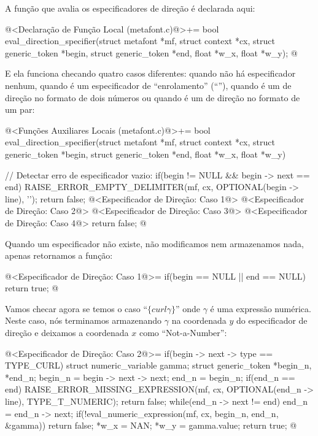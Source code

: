 {{{{{A função que avalia os especificadores de direção é declarada aqui:

\iniciocodigo
@<Declaração de Função Local (metafont.c)@>+=
bool eval_direction_specifier(struct metafont *mf, struct context *cx,
                              struct generic_token *begin,
                              struct generic_token *end, float *w_x,
                              float *w_y);
@
\fimcodigo

E ela funciona checando quatro casos diferentes: quando não há
especificador nenhum, quando é um especificador de ``enrolamento''
(``''), quando é um de direção no formato de dois
números ou quando é um de direção no formato de um par:

\iniciocodigo
@<Funções Auxiliares Locais (metafont.c)@>+=
bool eval_direction_specifier(struct metafont *mf, struct context *cx,
                              struct generic_token *begin,
                              struct generic_token *end, float *w_x,
                              float *w_y){
  // Detectar erro de especificador vazio:
  if(begin != NULL && begin -> next == end){
    RAISE_ERROR_EMPTY_DELIMITER(mf, cx, OPTIONAL(begin -> line), '{');
    return false;
  }
  @<Especificador de Direção: Caso 1@>
  @<Especificador de Direção: Caso 2@>
  @<Especificador de Direção: Caso 3@>
  @<Especificador de Direção: Caso 4@>
  return false;
}
@
\fimcodigo

Quando um especificador não existe, não modificamos nem armazenamos
nada, apenas retornamos a função:

\iniciocodigo
@<Especificador de Direção: Caso 1@>=
if(begin == NULL || end == NULL)
  return true;
@
\fimcodigo

Vamos checar agora se temos o caso ``$\{curl \gamma\}$'' onde $\gamma$ é
uma expressão numérica. Neste caso, nós terminamos armazenando
$\gamma$ na coordenada $y$ do especificador de direção e deixamos a
coordenada $x$ como ``Not-a-Number'':

\iniciocodigo
@<Especificador de Direção: Caso 2@>=
if(begin -> next -> type == TYPE_CURL){
  struct numeric_variable gamma;
  struct generic_token *begin_n, *end_n;
  begin_n = begin -> next -> next;
  end_n = begin_n;
  if(end_n == end){
    RAISE_ERROR_MISSING_EXPRESSION(mf, cx, OPTIONAL(end_n -> line),
                                   TYPE_T_NUMERIC);
    return false;
  }
  while(end_n -> next != end)
    end_n = end_n -> next;
  if(!eval_numeric_expression(mf, cx, begin_n, end_n, &gamma))
    return false;
  *w_x = NAN;
  *w_y = gamma.value;
  return true;
}
@
\fimcodigo


}}}}}}
